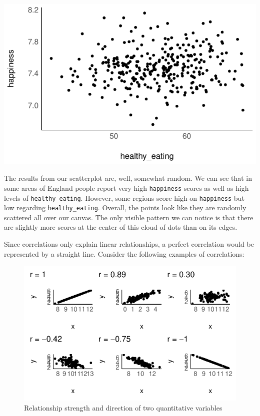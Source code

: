 \documentclass[
  letterpaper,
]{krantz}
\begin{document}
\includegraphics{10_correlations_files/figure-latex/correlation-happiness-healthy-eating-1.pdf}

The results from our scatterplot are, well, somewhat random. We can see
that in some areas of England people report very high \texttt{happiness}
scores as well as high levels of \texttt{healthy\_eating}. However, some
regions score high on \texttt{happiness} but low regarding
\texttt{healthy\_eating}. Overall, the points look like they are
randomly scattered all over our canvas. The only visible pattern we can
notice is that there are slightly more scores at the center of this
cloud of dots than on its edges.

Since correlations only explain linear relationships, a perfect
correlation would be represented by a straight line. Consider the
following examples of correlations:

\begin{figure}[H]

{\centering \includegraphics{10_correlations_files/figure-latex/correlation-examples-1.pdf}

}

\caption{Relationship strength and direction of two quantitative
variables}

\end{figure}%
\end{document}
